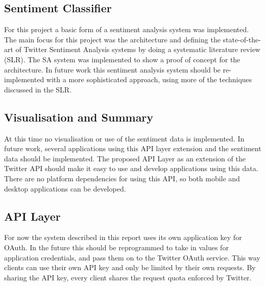 
\subsection{Sentiment Classifier}
For this project a basic form of a sentiment analysis system was implemented. The main focus for this project was the architecture and defining the state-of-the-art of Twitter Sentiment Analysis systems by doing a systematic literature review (SLR). The SA system was implemented to show a proof of concept for the architecture. In future work this sentiment analysis system should be re-implemented with a more sophisticated approach, using more of the techniques discussed in the SLR. 

\subsection{Visualisation and Summary}

At this time no visualisation or use of the sentiment data is implemented. In future work, several applications using this API layer extension and the sentiment data should be implemented. The proposed API Layer as an extension of the Twitter API should make it easy to use and develop applications using this data. There are no platform dependencies for using this API, so both mobile and desktop applications can be developed. 

\subsection{API Layer}

For now the system described in this report uses its own application key for OAuth. In the future this should be reprogrammed to take in values for application credentials, and pass them on to the Twitter OAuth service. This way clients can use their own API key and only be limited by their own requests. By sharing the API key, every client shares the request quota enforced by Twitter.


